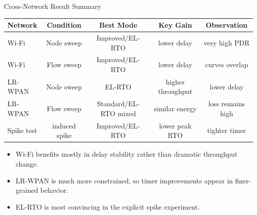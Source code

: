 \documentclass[aspectratio=169]{beamer}
\begin{document}
\begin{frame}{Cross-Network Result Summary}
  \small
  \begin{tabular}{lcccc}
    \toprule
    Network & Condition & Best Mode & Key Gain & Observation \\
    \midrule
    Wi-Fi & Node sweep & Improved/EL-RTO & lower delay & very high PDR \\
    Wi-Fi & Flow sweep & Improved/EL-RTO & lower delay & curves overlap \\
    LR-WPAN & Node sweep & EL-RTO & higher throughput & lower delay \\
    LR-WPAN & Flow sweep & Standard/EL-RTO mixed & similar energy & loss remains high \\
    Spike test & induced spike & Improved/EL-RTO & lower peak RTO & tighter timer \\
    \bottomrule
  \end{tabular}

  \vspace{0.35cm}
  \begin{itemize}
    \item Wi-Fi benefits mostly in delay stability rather than dramatic throughput change.
    \item LR-WPAN is much more constrained, so timer improvements appear in finer-grained behavior.
    \item EL-RTO is most convincing in the explicit spike experiment.
  \end{itemize}
\end{frame}
\end{document}
